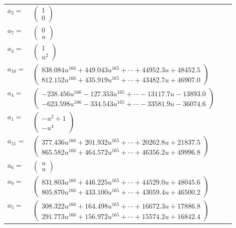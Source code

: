 \documentclass[1p]{elsarticle_modified}
\theoremstyle{definition}
\begin{document}
\begin{tabular}{m{7pt} m{180pt} m{7pt} m{180pt} }
\flushright $a_{2}=$&$\begin{pmatrix}1\\0\end{pmatrix}$ \\
\flushright $a_{7}=$&$\begin{pmatrix}0\\u\end{pmatrix}$ \\
\flushright $a_{3}=$&$\begin{pmatrix}1\\u^2\end{pmatrix}$ \\
\flushright $a_{10}=$&$\begin{pmatrix}838.084 u^{166}+449.043 u^{165}+\cdots+44952.3 u+48452.5\\812.152 u^{166}+435.919 u^{165}+\cdots+43482.7 u+46907.0\end{pmatrix}$ \\
\flushright $a_{4}=$&$\begin{pmatrix}-238.456 u^{166}-127.353 u^{165}+\cdots-13117.7 u-13893.0\\-623.598 u^{166}-334.543 u^{165}+\cdots-33581.9 u-36074.6\end{pmatrix}$ \\
\flushright $a_{1}=$&$\begin{pmatrix}- u^2+1\\- u^4\end{pmatrix}$ \\
\flushright $a_{11}=$&$\begin{pmatrix}377.436 u^{166}+201.932 u^{165}+\cdots+20262.8 u+21837.5\\865.582 u^{166}+464.572 u^{165}+\cdots+46356.2 u+49996.8\end{pmatrix}$ \\
\flushright $a_{6}=$&$\begin{pmatrix}u\\u\end{pmatrix}$ \\
\flushright $a_{9}=$&$\begin{pmatrix}831.803 u^{166}+446.225 u^{165}+\cdots+44529.0 u+48045.6\\805.870 u^{166}+433.100 u^{165}+\cdots+43059.4 u+46500.2\end{pmatrix}$ \\
\flushright $a_{5}=$&$\begin{pmatrix}308.322 u^{166}+164.498 u^{165}+\cdots+16672.3 u+17886.8\\291.773 u^{166}+156.972 u^{165}+\cdots+15574.2 u+16842.4\end{pmatrix}$ \\

\end{tabular}
\end{document}
